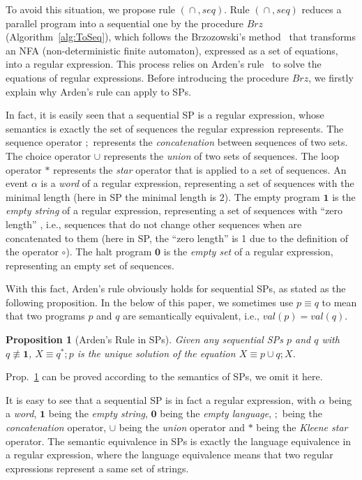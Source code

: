 \documentclass{fcs}
\newtheorem{prop}{Proposition}[section]
\newcommand{\noth}[0]{\mathbf{1}}
\newcommand{\halt}[0]{\mathbf{0}}
\newcommand{\val}[0]{\mathit{val}}
\DeclareMathOperator{\seq}{;}
\DeclareMathOperator{\para}{\cap}
\newcommand{\ToSeq}[0]{\mathit{Brz}}
\begin{document}
To avoid this situation, we propose rule $(\para, \mathit{seq})$.
Rule $(\para, \mathit{seq})$ reduces a parallel program into a sequential one by the procedure $\ToSeq$ (Algorithm~\ref{alg:ToSeq}), which
follows the Brzozowski's method~\cite{Brzozowski64} that transforms an NFA (non-deterministic finite automaton), expressed as a set of equations, into a regular expression.
This process  relies on Arden's rule~\cite{Arden61} to solve the equations of regular expressions.
Before introducing the procedure $\ToSeq$, we firstly explain why Arden's rule can apply to SPs.


In fact, it is easily seen that a sequential SP is a regular expression, whose semantics is exactly the set of sequences the regular expression represents.
The sequence operator $\seq$ represents the \emph{concatenation} between sequences of two sets.
The choice operator $\cup$ represents the \emph{union} of two sets of sequences.
The loop operator $*$ represents the \emph{star} operator that is applied to a set of sequences.
An event $\alpha$ is a \emph{word} of a regular expression, representing a set of sequences with the minimal length (here in SP the minimal length is $2$).
The empty program $\noth$ is the \emph{empty string} of a regular expression, representing a set of sequences with ``zero length'' , i.e., sequences that do not change other sequences when are concatenated to them (here in SP, the ``zero length'' is 1 due to the definition of the operator $\circ$). %
The halt program $\halt$ is the \emph{empty set} of a regular expression, representing an empty set of sequences.

With this fact, Arden's rule obviously holds for sequential SPs, as stated as the following proposition.
In the below of this paper, we sometimes use $p \equiv q$ to mean that two programs $p$ and $q$ are semantically equivalent, i.e., $\val(p) = \val(q)$.

\begin{prop}[Arden's Rule in SPs]
    \label{prop:Arden's Rule in SPs}
    Given any sequential SPs $p$ and $q$ with $q\not\equiv \noth$, $X \equiv q^*\seq p$ is the unique solution of the equation $X\equiv p\cup q\seq X$.
\end{prop}

Prop.~\ref{prop:Arden's Rule in SPs} can be proved according to the semantics of SPs, we omit it here.

\ifx
It is easy to see that a sequential SP is in fact a regular expression, with $\alpha$ being a \emph{word}, $\noth$ being the \emph{empty string}, $\halt$ being the \emph{empty language}, $\seq$ being the \emph{concatenation} operator,
$\cup$ being the \emph{union} operator and $*$ being the \emph{Kleene star} operator.
The semantic equivalence in SPs is exactly the language equivalence in a regular expression, where the language equivalence means that two regular expressions represent a same set of strings.
\fi
\end{document}
